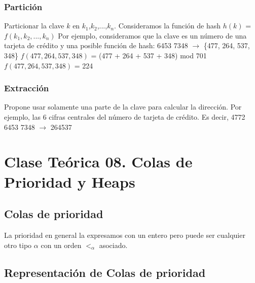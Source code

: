 \documentclass[10pt,a4paper]{article}
\begin{document}
\subsubsection{Partición}

Particionar la clave $k$ en $k_{1}$,$k_{2}$,...,$k_{n}$.
\newline
\newline
Consideramos la función de hash $h(k)$ = $f(k_{1},k_{2},...,k_{n})$
\newline
\newline
Por ejemplo, consideramos que la clave es un número de una tarjeta de crédito y una posible función de hash:
\newline
{} 6453 7348 $\rightarrow$ \{477, 264, 537, 348\} 
\newline
\newline
$f(477, 264, 537, 348)$ = (477 + 264 + 537 + 348) mod 701
\newline
\newline
$f(477, 264, 537, 348)$ = 224

\subsubsection{Extracción}

Propone usar solamente una parte de la clave para calcular la dirección.
\newline
\newline
Por ejemplo, las 6 cifras centrales del número de tarjeta de crédito. Es decir, 4772 6453 7348 $\rightarrow$ 264537
\newpage
\section{Clase Teórica 08. Colas de Prioridad y Heaps}

\subsection{Colas de prioridad}

La prioridad en general la expresamos con un entero pero puede ser cualquier otro tipo $\alpha$ con un orden $<_{\alpha}$ asociado.

\subsection{Representación de Colas de prioridad}
\end{document}
